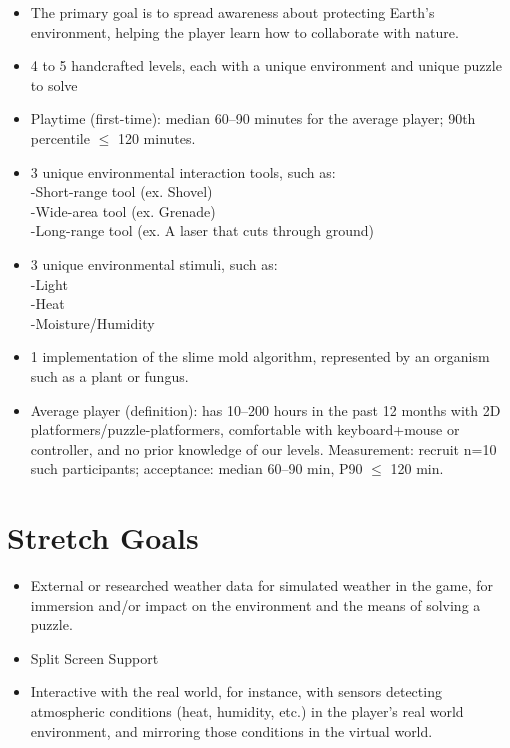 \documentclass{article}
\begin{document}
\begin{itemize}
\renewcommand\labelitemi{--}
\item{The primary goal is to spread awareness about protecting Earth’s environment, helping the player learn how to collaborate with nature.}
\item{4 to 5 handcrafted levels, each with a unique environment and unique puzzle to solve}
\item{Playtime (first-time): median 60–90 minutes for the average player; 90th percentile $\leq$ 120 minutes.}
\item{3 unique environmental interaction tools, such as:\\ -Short-range tool (ex. Shovel)\\ -Wide-area tool (ex. Grenade)\\ -Long-range tool (ex. A laser that cuts through ground)}
\item{3 unique environmental stimuli, such as:\\ -Light\\ -Heat\\ -Moisture/Humidity}
\item{1 implementation of the slime mold algorithm, represented by an organism such as a plant or fungus.}
\item{Average player (definition): has 10–200 hours in the past 12 months with 2D platformers/puzzle-platformers, comfortable with keyboard+mouse or controller, and no prior knowledge of our levels. Measurement: recruit n=10 such participants; acceptance: median 60–90 min, P90 $\leq$ 120 min.}
\end{itemize}

\section{Stretch Goals}

\begin{itemize}
\item{External or researched weather data for simulated weather in the game, for immersion and/or impact on the environment and the means of solving a puzzle.}
\item{Split Screen Support}
\item{Interactive with the real world, for instance, with sensors detecting atmospheric conditions (heat, humidity, etc.) in the player’s real world environment, and mirroring those conditions in the virtual world.}
\end{itemize}
\end{document}
